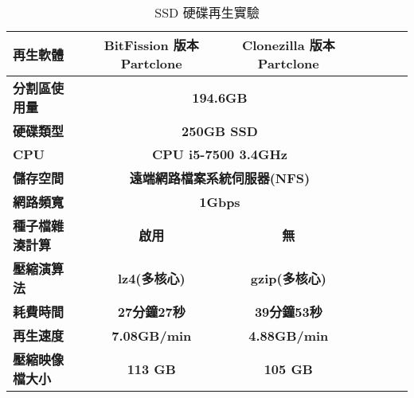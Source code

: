 \begin{table}[!htbp]
\centering
\caption{SSD 硬碟再生實驗}
\label{imaging_ssd}
\begin{adjustbox}{max width=0.92\textwidth}
\begin{tabular}{lcccccc}

\toprule
\multicolumn{1}{l}{\textbf{再生軟體}} & \textbf{BitFission 版本 Partclone} & \textbf{Clonezilla 版本 Partclone} \\ \midrule
\multicolumn{1}{l}{\textbf{分割區使用量}} & \multicolumn{2}{c}{\textbf{194.6GB}} \\

\multicolumn{1}{l}{\textbf{硬碟類型}} & \multicolumn{2}{c}{\textbf{250GB SSD}} \\

\multicolumn{1}{l}{\textbf{CPU}} & \multicolumn{2}{c}{\textbf{CPU i5-7500 3.4GHz}} \\

\multicolumn{1}{l}{\textbf{儲存空間}} & \multicolumn{2}{c}{\textbf{遠端網路檔案系統伺服器(NFS)}} \\

\multicolumn{1}{l}{\textbf{網路頻寬}} & \multicolumn{2}{c}{\textbf{1Gbps}} \\

\multicolumn{1}{l}{\textbf{種子檔雜湊計算}} & \textbf{啟用} & \textbf{無} \\

\multicolumn{1}{l}{\textbf{壓縮演算法}} & \textbf{lz4(多核心)} & \textbf{gzip(多核心)} \\

\multicolumn{1}{l}{\textbf{耗費時間}} & \textbf{27分鐘27秒} & \textbf{39分鐘53秒} \\

\multicolumn{1}{l}{\textbf{再生速度}} & \textbf{7.08GB/min} & \textbf{4.88GB/min} \\

\multicolumn{1}{l}{\textbf{壓縮映像檔大小}} & \textbf{113 GB} & \textbf{105 GB} \\

\bottomrule
\end{tabular}
\end{adjustbox}
\end{table}
